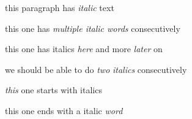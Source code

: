 
this paragraph has \emph{italic}  text

this one has \emph{multiple italic words}  consecutively

this one has italics \emph{here} and more \emph{later}  on

we should be able to do \emph{two} \emph{italics} consecutively

\emph{this} one starts with italics

this one ends with a italic \emph{word}
